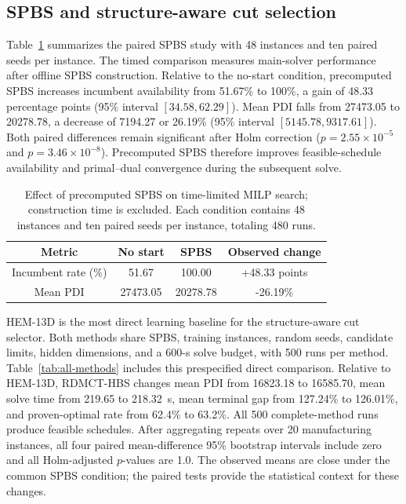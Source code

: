 \documentclass[journal]{IEEEtran}
\newcommand{\method}{RDMCT-HBS}
\begin{document}
\subsection{SPBS and structure-aware cut selection}

Table~\ref{tab:spbs-en-new} summarizes the paired SPBS study with 48 instances and ten paired seeds per instance. The timed comparison measures main-solver performance after offline SPBS construction. Relative to the no-start condition, precomputed SPBS increases incumbent availability from 51.67\% to 100\%, a gain of 48.33 percentage points (95\% interval $[34.58,62.29]$). Mean PDI falls from 27473.05 to 20278.78, a decrease of 7194.27 or 26.19\% (95\% interval $[5145.78,9317.61]$). Both paired differences remain significant after Holm correction ($p=2.55\times10^{-5}$ and $p=3.46\times10^{-8}$). Precomputed SPBS therefore improves feasible-schedule availability and primal--dual convergence during the subsequent solve.

\begin{table}[!htbp]
\centering
\footnotesize
\setlength{\tabcolsep}{3pt}
\caption{Effect of precomputed SPBS on time-limited MILP search; construction time is excluded. Each condition contains 48 instances and ten paired seeds per instance, totaling 480 runs.}
\label{tab:spbs-en-new}
\begin{tabular}{cccc}
\toprule
Metric & No start & SPBS & Observed change\\
\midrule
Incumbent rate (\%) & 51.67 & 100.00 & +48.33 points\\
Mean PDI & 27473.05 & 20278.78 & -26.19\%\\
\bottomrule
\end{tabular}
\end{table}

HEM-13D is the most direct learning baseline for the structure-aware cut selector. Both methods share SPBS, training instances, random seeds, candidate limits, hidden dimensions, and a 600-s solve budget, with 500 runs per method. Table~\ref{tab:all-methods} includes this prespecified direct comparison. Relative to HEM-13D, \method{} changes mean PDI from 16823.18 to 16585.70, mean solve time from 219.65 to 218.32~s, mean terminal gap from 127.24\% to 126.01\%, and proven-optimal rate from 62.4\% to 63.2\%. All 500 complete-method runs produce feasible schedules. After aggregating repeats over 20 manufacturing instances, all four paired mean-difference 95\% bootstrap intervals include zero and all Holm-adjusted $p$-values are 1.0. The observed means are close under the common SPBS condition; the paired tests provide the statistical context for these changes.
\end{document}
